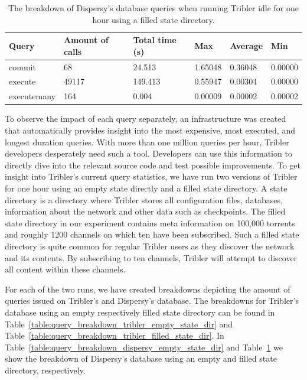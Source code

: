\begin{table}[h]
	\centering
	\caption{The breakdown of Dispersy's database queries when running Tribler idle for one hour using a filled state directory.}
	\label{table:query_breakdown_dispersy_filled_state_dir}
	\begin{tabular}{|l|l|l|l|l|l|}
		\hline
		\textbf{Query} & \textbf{Amount of calls} & \textbf{Total time (s)} & \textbf{Max} & \textbf{Average} & \textbf{Min} \\ \hline
		commit   & 68   & 24.513   & 1.65048   & 0.36048   & 0.00000   \\ \hline
		execute   & 49117   & 149.413   & 0.55947   & 0.00304   & 0.00000   \\ \hline
		executemany   & 164   & 0.004   & 0.00009   & 0.00002   & 0.00002   \\ \hline
	\end{tabular}
\end{table}

To observe the impact of each query separately, an infrastructure was created that automatically provides insight into the most expensive, most executed, and longest duration queries. 
With more than one million queries per hour, Tribler developers desperately need such a tool.
Developers can use this information to directly dive into the relevant source code and test possible improvements.
To get insight into Tribler's current query statistics, we have run two versions of Tribler for one hour using an empty state directly and a filled state directory.
A state directory is a directory where Tribler stores all configuration files, databases, information about the network and other data such as checkpoints.
The filled state directory in our experiment contains meta information on 100,000 torrents and roughly 1200 channels on which ten have been subscribed.
Such a filled state directory is quite common for regular Tribler users as they discover the network and its contents.
By subscribing to ten channels, Tribler will attempt to discover all content within these channels.

For each of the two runs, we have created breakdowns depicting the amount of queries issued on Tribler's and Dispersy's database.
The breakdowns for Tribler's database using an empty respectively filled state directory can be found in Table~\ref{table:query_breakdown_tribler_empty_state_dir} and Table~\ref{table:query_breakdown_tribler_filled_state_dir}.
In Table~\ref{table:query_breakdown_dispersy_empty_state_dir} and Table~\ref{table:query_breakdown_dispersy_filled_state_dir} we show the breakdown of Dispersy's database using an empty and filled state directory, respectively.

